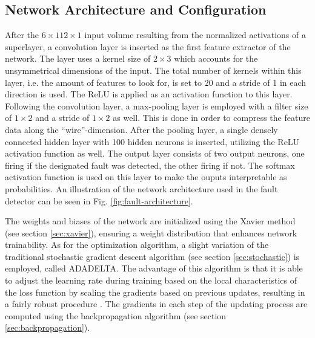 \subsection{Network Architecture and Configuration}

After the \(6 \times 112 \times 1\) input volume resulting from the
normalized activations of a superlayer, a convolution layer
is inserted as the first feature extractor of the network. The layer
uses a kernel size of \(2 \times 3\) which accounts for the
unsymmetrical dimensions of the input. The total number of kernels
within this layer, i.e. the amount of features to look for, is set to
20 and a stride of 1 in each direction is used. The ReLU is applied
as an activation function to this layer.
Following the convolution layer, a max-pooling layer is employed with a
filter size of \(1 \times 2\) and a stride of \(1 \times 2\) as
well. This is done in order to compress the feature data along the
``wire''-dimension. After the pooling layer, a single densely
connected hidden layer with 100 hidden neurons is inserted, utilizing
the ReLU activation function as well. The output layer consists of two
output neurons, one firing if the designated fault was detected, the
other firing if not. The softmax activation function is used on this
layer to make the ouputs interpretable as probabilities. An
illustration of the network architecture used in the fault detector
can be seen in Fig. \ref{fig:fault-architecture}.

The weights and biases of the network are initialized using the Xavier
method (see section \ref{sec:xavier}), ensuring a weight distribution
that enhances network trainability. As for the optimization algorithm,
a slight variation of the traditional stochastic gradient
descent algorithm (see section \ref{sec:stochastic}) is employed,
called ADADELTA. The advantage of this algorithm is that it is able to
adjust the learning rate during training based on the local
characteristics of the loss function by scaling the gradients based on
previous updates, resulting in a fairly robust procedure
\cite{adadelta}. The gradients in each step of the updating process
are computed using the backpropagation algorithm (see section
\ref{sec:backpropagation}).

